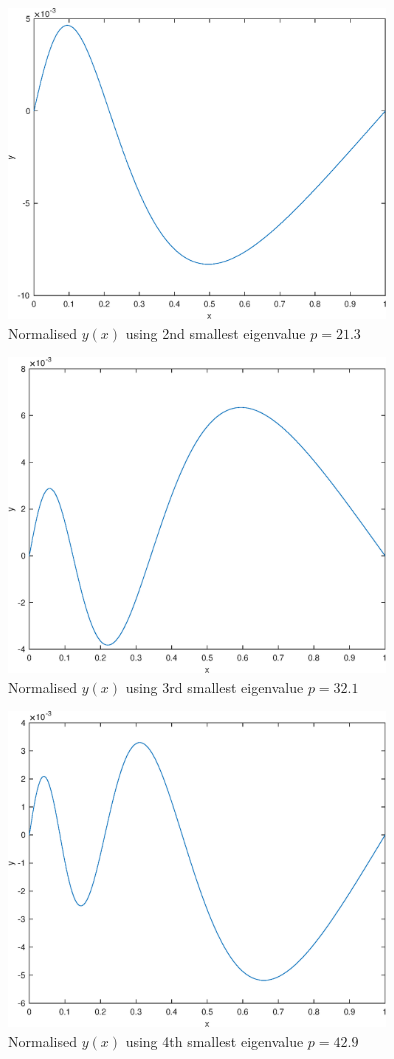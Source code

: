 \documentclass[10pt,a4paper,notitlepage]{article}
\begin{document}
\begin{figure}[H]
\begin{center}
\includegraphics[width=10cm]{Image_9_2}
\caption{Normalised $y(x)$ using 2nd smallest eigenvalue $p=21.3$}
\end{center}
\end{figure}
\begin{figure}[H]
\begin{center}
\includegraphics[width=10cm]{Image_9_3}
\caption{Normalised $y(x)$ using 3rd smallest eigenvalue $p=32.1$}
\end{center}
\end{figure}
\begin{figure}[H]
\begin{center}
\includegraphics[width=10cm]{Image_9_4}
\caption{Normalised $y(x)$ using 4th smallest eigenvalue $p=42.9$}
\end{center}
\end{figure}
\end{document}
